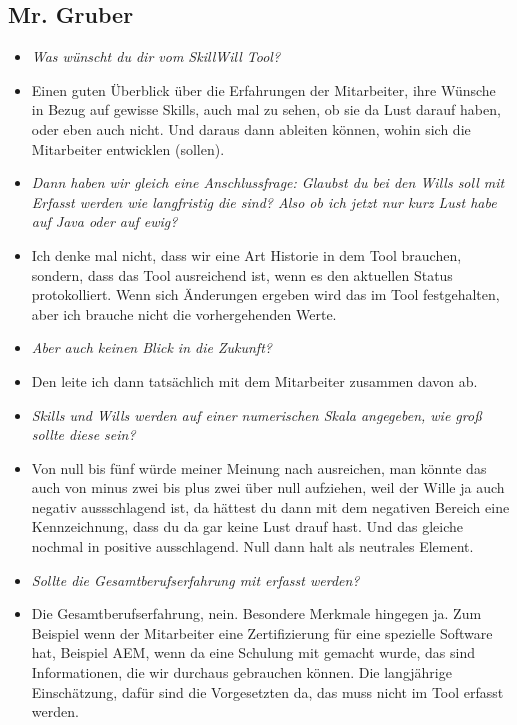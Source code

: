 \subsection{Mr. Gruber}
\begin{itemize}
\item[] \textit{Was wünscht du dir vom SkillWill Tool?}
\item[] Einen guten Überblick über die Erfahrungen der Mitarbeiter, ihre Wünsche in Bezug auf gewisse Skills, auch mal zu sehen, ob sie da Lust darauf haben, oder eben auch nicht. Und daraus dann ableiten können, wohin sich die Mitarbeiter entwicklen (sollen).

\item[] \textit{Dann haben wir gleich eine Anschlussfrage: Glaubst du bei den Wills soll mit Erfasst werden wie langfristig die sind? Also ob ich jetzt nur kurz Lust habe auf Java oder auf ewig?}
\item[] Ich denke mal nicht, dass wir eine Art Historie in dem Tool brauchen, sondern, dass das Tool ausreichend ist, wenn es den aktuellen Status protokolliert. Wenn sich Änderungen ergeben wird das im Tool festgehalten, aber ich brauche nicht die vorhergehenden Werte.

\item[] \textit{Aber auch keinen Blick in die Zukunft?}
\item[] Den leite ich dann tatsächlich mit dem Mitarbeiter zusammen davon ab.

\item[] \textit{Skills und Wills werden auf einer numerischen Skala angegeben, wie groß sollte diese sein?}
\item[] Von null bis fünf würde meiner Meinung nach ausreichen, man könnte das auch von minus zwei bis plus zwei über null aufziehen, weil der Wille ja auch negativ aussschlagend ist, da hättest du dann mit dem negativen Bereich eine Kennzeichnung, dass du da gar keine Lust drauf hast. Und das gleiche nochmal in positive ausschlagend. Null dann halt als neutrales Element.

\item[] \textit{Sollte die Gesamtberufserfahrung mit erfasst werden?}
\item[] Die Gesamtberufserfahrung, nein. Besondere Merkmale hingegen ja. Zum Beispiel wenn der Mitarbeiter eine Zertifizierung für eine spezielle Software hat, Beispiel AEM, wenn da eine Schulung mit gemacht wurde, das sind Informationen, die wir durchaus gebrauchen können.  Die langjährige Einschätzung, dafür sind die Vorgesetzten da, das muss nicht im Tool erfasst werden.


\end{itemize}
